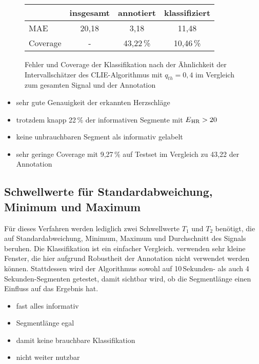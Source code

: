 \begin{figure}
	\centering
	\begin{tabular}{l || c | c | c }
					& insgesamt	& annotiert		& klassifiziert	\\ \hline
		\ac{MAE} 	& 20{,}18	& 3{,}18			& 11{,}48		\\
		Coverage	& -			& 43{,}22\,\%	& 10{,}46\,\%	\\
	\end{tabular}
	\caption[Fehler und Coverage der Klassifikation nach der Ähnlichkeit der Intervallschätzer des CLIE-Algorithmus mit $q_{th}=0{,}4$ im Vergleich zum gesamten Signal und der Annotation]{Fehler und Coverage der Klassifikation nach der Ähnlichkeit der Intervallschätzer des CLIE-Algorithmus mit $q_{th}=0{,}4$ im Vergleich zum gesamten Signal und der Annotation}
\end{figure}

\begin{itemize}
	\item sehr gute Genauigkeit der erkannten Herzschläge
	\item trotzdem knapp 22\,\% der informativen Segmente mit $E\textsubscript{HR} > 20$
	\item keine unbrauchbaren Segment als informativ gelabelt
	\item sehr geringe Coverage mit 9{,}27\,\% auf Testset im Vergleich zu 43{,}22 der Annotation
\end{itemize}


\subsection{Schwellwerte für Standardabweichung, Minimum und Maximum}

Für dieses Verfahren werden lediglich zwei Schwellwerte $T_1$ und $T_2$ benötigt, die auf Standardabweichung, Minimum, Maximum und Durchschnitt des Signals beruhen. Die Klassifikation ist ein einfacher Vergleich. \citeauthor{Pino2015} verwenden sehr kleine Fenster, die hier aufgrund Robustheit der Annotation nicht verwendet werden können. Stattdessen wird der Algorithmus sowohl auf 10\,Sekunden- als auch 4\,Sekunden-Segmenten getestet, damit sichtbar wird, ob die Segmentlänge einen Einfluss auf das Ergebnis hat.

\begin{itemize}
	\item fast alles informativ
	\item Segmentlänge egal
	\item damit keine brauchbare Klassifikation
	\item nicht weiter nutzbar
\end{itemize}

